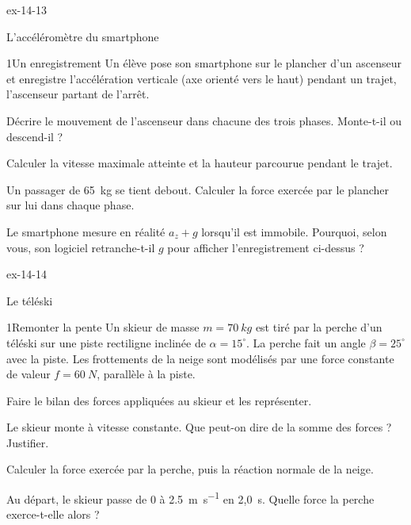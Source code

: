 \begin{blocLivre}{ex-14-13}
\begin{exercice}[3]{L'accéléromètre du smartphone}
\begin{docu}{1}{Un enregistrement}
Un élève pose son smartphone sur le plancher d'un ascenseur et enregistre l'accélération verticale (axe orienté vers
le haut) pendant un trajet, l'ascenseur partant de l'arrêt.
\end{docu}
\begin{questions}
\item Décrire le mouvement de l'ascenseur dans chacune des trois phases. Monte-t-il ou descend-il ?
\item Calculer la vitesse maximale atteinte et la hauteur parcourue pendant le trajet.
\item \initiative Un passager de 65~kg se tient debout. Calculer la force exercée par le plancher sur lui dans chaque
phase.
\item Le smartphone mesure en réalité $a_z+g$ lorsqu'il est immobile. Pourquoi, selon vous, son logiciel retranche-t-il
$g$ pour afficher l'enregistrement ci-dessus ?
\end{questions}
\end{exercice}
\end{blocLivre}
\begin{blocLivre}{ex-14-14}
\begin{exercice}[3]{Le téléski}
\begin{docu}{1}{Remonter la pente}
Un skieur de masse $m=\qty{70}{kg}$ est tiré par la perche d'un téléski sur une piste rectiligne inclinée de
$\alpha=15^\circ$. La perche fait un angle $\beta=25^\circ$ avec la piste. Les frottements de la neige sont modélisés par
une force constante de valeur $f=\qty{60}{N}$, parallèle à la piste.
\end{docu}
\begin{questions}
\item Faire le bilan des forces appliquées au skieur et les représenter.
\item Le skieur monte à vitesse constante. Que peut-on dire de la somme des forces ? Justifier.
\item \initiative Calculer la force exercée par la perche, puis la réaction normale de la neige.
\item Au départ, le skieur passe de 0 à \qty{2,5}{m.s^{-1}} en 2,0~s. Quelle force la perche exerce-t-elle alors ?
\end{questions}
\end{exercice}
\end{blocLivre}
